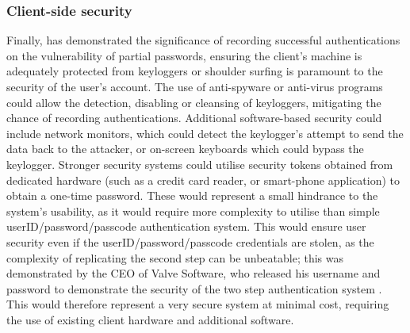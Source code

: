 \documentclass[british,11pt,a4paper]{article}
\begin{document}
\subsubsection{Client-side security}
Finally, \citet{Aspinall2013-sh} has demonstrated the significance of recording successful authentications on the vulnerability of partial passwords, ensuring the client's machine is adequately protected from keyloggers or shoulder surfing is paramount to the security of the user's account. The use of anti-spyware or anti-virus programs could allow the detection, disabling or cleansing of keyloggers, mitigating the chance of recording authentications. Additional software-based security could include network monitors, which could detect the keylogger's attempt to send the data back to the attacker, or on-screen keyboards which could bypass the keylogger. Stronger security systems could utilise security tokens obtained from dedicated hardware (such as a credit card reader, or smart-phone application) to obtain a one-time password. These would represent a small hindrance to the system's usability, as it would require more complexity to utilise than simple userID/password/passcode authentication system. This would ensure user security even if the userID/password/passcode credentials are stolen, as the complexity of replicating the second step can be unbeatable; this was demonstrated by the CEO of Valve Software, who released his username and password to demonstrate the security of the two step authentication system \cite{Purslow2011-qa}. This would therefore represent a very secure system at minimal cost, requiring the use of existing client hardware and additional software.

\clearpage


\clearpage
\end{document}
